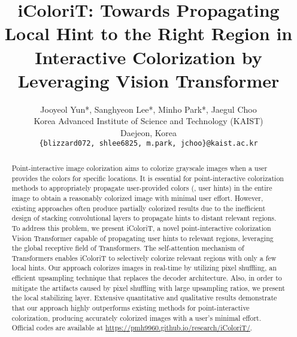 \documentclass[10pt,twocolumn,letterpaper]{article}
\begin{document}
\newcommand{\jy}[1]{{\color{neon}#1}}
\newcommand{\mh}[1]{{\color{blackpink}#1}}
\newcommand{\sh}[1]{{\color{hwanta}#1}}
\newcommand{\win}[1]{{\small{\color{blue}#1}}}
\newcommand{\lose}[1]{{\small{\color{red}#1}}}

\def\etc{\emph{etc}\onedot} \def\vs{\emph{vs}\onedot}
\def\smalleq{\texttt{=}}


\title{iColoriT: Towards Propagating Local Hint to the Right Region in Interactive Colorization by Leveraging Vision Transformer}

\author{
Jooyeol Yun*, \quad Sanghyeon Lee*, \quad Minho Park*, \quad Jaegul Choo\\
Korea Advanced Institute of Science and Technology (KAIST)\\
Daejeon, Korea\\
{\tt\small  \{blizzard072, shlee6825, m.park, jchoo\}@kaist.ac.kr}
}

\maketitle
\thispagestyle{empty}

\begin{abstract}
Point-interactive image colorization aims to colorize grayscale images when a user provides the colors for specific locations. 
It is essential for point-interactive colorization methods to appropriately propagate user-provided colors (\ie, user hints) in the entire image to obtain a reasonably colorized image with minimal user effort. 
However, existing approaches often produce partially colorized results due to the inefficient design of stacking convolutional layers to propagate hints to distant relevant regions. 
To address this problem, we present iColoriT, a novel point-interactive colorization Vision Transformer capable of propagating user hints to relevant regions, leveraging the global receptive field of Transformers. 
The self-attention mechanism of Transformers enables iColoriT to selectively colorize relevant regions with only a few local hints. 
Our approach colorizes images in real-time by utilizing pixel shuffling, an efficient upsampling technique that replaces the decoder architecture. 
Also, in order to mitigate the artifacts caused by pixel shuffling with large upsampling ratios, we present the local stabilizing layer. 
Extensive quantitative and qualitative results demonstrate that our approach highly outperforms existing methods for point-interactive colorization, producing accurately colorized images with a user's minimal effort. 
Official codes are available at {\url{https://pmh9960.github.io/research/iColoriT/}.}

\end{abstract}
\end{document}
